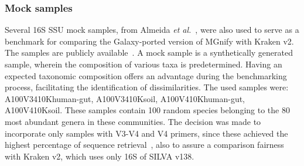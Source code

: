 \subsubsection{Mock samples}\label{subsubsec:mock_samples}
Several 16S SSU mock samples, from Almeida \emph{et al.}~\cite{almeida_benchmarking_2018}, were also used to serve as a benchmark for comparing the Galaxy-ported version of MGnify with Kraken v2. The samples are publicly available~\cite{noauthor_index_nodate}. A mock sample is a synthetically generated sample, wherein the composition of various taxa is predetermined. Having an expected taxonomic composition offers an advantage during the benchmarking process, facilitating the identification of dissimilarities. The used samples were: A100\textunderscore V34\textunderscore 10K\textunderscore human-gut, A100\textunderscore V34\textunderscore 10K\textunderscore soil, A100\textunderscore V4\textunderscore 10K\textunderscore human-gut, A100\textunderscore V4\textunderscore 10K\textunderscore soil. These samples contain 100 random species belonging to the 80 most abundant genera in these communities. The decision was made to incorporate only samples with V3-V4 and V4 primers, since these achieved the highest percentage of sequence retrieval~\cite{almeida_benchmarking_2018}, also to assure a comparison fairness with Kraken v2, which uses only 16S of SILVA v138.